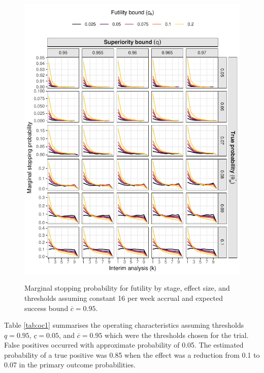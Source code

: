 \documentclass{bmcart}
\begin{document}
\begin{figure}[!ht]
	\caption{Marginal stopping probability for futility by stage, effect size, and thresholds assuming constant 16 per week accrual and expected success bound $\overline{c}=0.95$.}
	\includegraphics{figures/stop_futility_16.pdf}
	\label{fig:stop_futility_16}
\end{figure}

Table \ref{tab:oc1} summarises the operating characteristics assuming thresholds $q=0.95$, $\underline{c}=0.05$, and $\overline{c}=0.95$ which were the thresholds chosen for the trial.
False positives occurred with approximate probability of 0.05.
The estimated probability of a true positive was 0.85 when the effect was a reduction from 0.1 to 0.07 in the primary outcome probabilities.
\end{document}
